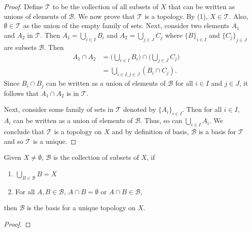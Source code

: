 \begin{proof}
    Define \( \mathcal{T}  \) to be the collection of all subsets of \( X  \) that can be written as unions of elements of \( \mathcal{B} \). We now prove that \( \mathcal{T} \) is a topology. By (1), \( X \in \mathcal{ T } \). Also, \( \emptyset \in \mathcal{T} \) as the union of the empty family of sets. Next, consider two elements \( {A}_{1} \) and \( {A}_{2} \) in \( \mathcal{T} \). Then \( {A}_{1} = \bigcup_{ i \in I  }^{  }  {B}_{i} \) and \( {A}_{2} = \bigcup_{ j\in J  }^{  }  {C}_{j} \) where \( \{ B\}_{i \in I}  \) and \( {\{ {C}_{j} \} }_{j \in J }  \) are subsets \( \mathcal{B} \). Then 
    \begin{align*}
        {A}_{1} \cap {A}_{2} &= \Big(  \bigcup_{ i \in I  }^{   }  {B}_{i} \Big) \cap \Big( \bigcup_{ j \in J  }^{  }  {C}_{j} \Big)  \\
                             &= \bigcup_{ i \in I , j \in J  }^{  }  ({B}_{i} \cap {C}_{j}).
    \end{align*}
    Since \( {B}_{i} \cap {B}_{j} \) can be written as a union of elements of \( \mathcal{B} \) for all \( i \in I  \) and \( j \in J  \), it follows that \( {A}_{1} \cap {A}_{2}  \) is in \( \mathcal{T} \).

    Next, consider some family of sets in \( \mathcal{T} \) denoted by \( \{ {A}_{i} \}_{i \in I} \). Then for all \( i \in I  \), \( {A}_{i} \) can be written as a union of elements of \( \mathcal{B} \). Thus, so can \( \bigcup_{  i \in I  }^{  }  {A}_{i} \). We conclude that \( \mathcal{T} \) is a topology on \( X  \) and by definition of basis, \( \mathcal{B} \) is a basis for \( \mathcal{T} \) and so \( \mathcal{T} \) is a unique.

\end{proof}

\begin{corollary}
    Given \( X \neq \emptyset  \), \( \mathcal{B} \) is the collection of subsets of \( X  \), if
    \begin{enumerate}
        \item[(i)] \( \bigcup_{ B \in \mathcal{B} }^{  }  B = X  \)
        \item[(ii)] For all \( A, B \in \mathcal{B} \), \( A \cap B = \emptyset  \) or \( A \cap B \in \mathcal{B} \),
    \end{enumerate}
    then \( \mathcal{B} \) is the basis for a unique topology on \( X  \).
\end{corollary}

\begin{proof}

\end{proof}


